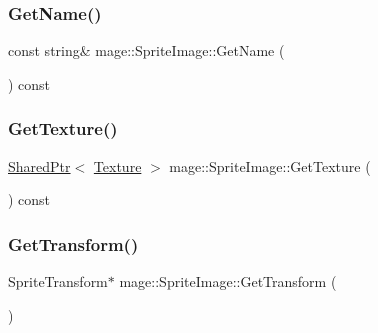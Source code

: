 \hypertarget{classmage_1_1_sprite_image_a916f6afbb6d48b1feb4dd80740b7ce08}{}\label{classmage_1_1_sprite_image_a916f6afbb6d48b1feb4dd80740b7ce08} 
\subsubsection{\texorpdfstring{Get\+Name()}{GetName()}}
{\footnotesize\ttfamily const string\& mage\+::\+Sprite\+Image\+::\+Get\+Name (\begin{DoxyParamCaption}{ }\end{DoxyParamCaption}) const}

\hypertarget{classmage_1_1_sprite_image_a3c04fb68baaf44e4ee8beb08aff26f35}{}\label{classmage_1_1_sprite_image_a3c04fb68baaf44e4ee8beb08aff26f35} 
\subsubsection{\texorpdfstring{Get\+Texture()}{GetTexture()}}
{\footnotesize\ttfamily \hyperlink{namespacemage_a1e01ae66713838a7a67d30e44c67703e}{Shared\+Ptr}$<$ \hyperlink{classmage_1_1_texture}{Texture} $>$ mage\+::\+Sprite\+Image\+::\+Get\+Texture (\begin{DoxyParamCaption}{ }\end{DoxyParamCaption}) const}

\hypertarget{classmage_1_1_sprite_image_ab39404c038dde5b6ba6c05df35f80b48}{}\label{classmage_1_1_sprite_image_ab39404c038dde5b6ba6c05df35f80b48} 
\subsubsection{\texorpdfstring{Get\+Transform()}{GetTransform()}\hspace{0.1cm}{\footnotesize\ttfamily [1/2]}}
{\footnotesize\ttfamily Sprite\+Transform$\ast$ mage\+::\+Sprite\+Image\+::\+Get\+Transform (\begin{DoxyParamCaption}{ }\end{DoxyParamCaption})}

\hypertarget{classmage_1_1_sprite_image_a3f49b42a7902421115601c2e5d73e795}{}\label{classmage_1_1_sprite_image_a3f49b42a7902421115601c2e5d73e795} 

